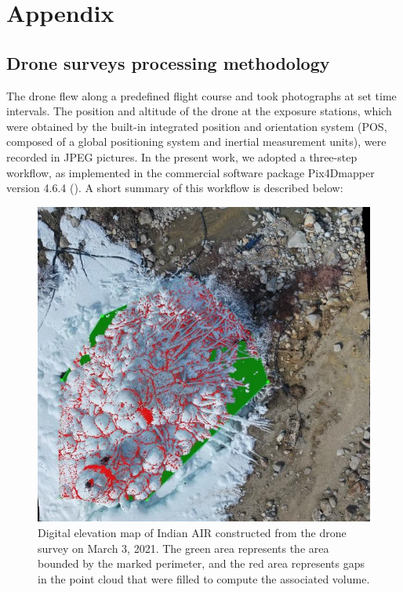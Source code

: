 \chapter{Appendix}
\label{sec:appendix}

\section{Drone surveys processing methodology}
\label{sec:drone_method}

The drone flew along a predefined flight course and took photographs at set time intervals. The
position and altitude of the drone at the exposure stations, which were obtained by the built-in integrated
position and orientation system (POS, composed of a global positioning system and inertial measurement units),
were recorded in JPEG pictures. In the present work, we adopted a three-step workflow, as implemented in the
commercial software package Pix4Dmapper version 4.6.4 (\cite{pix4dsaPix4DmapperUserManual2020}). A short summary of this workflow is
described below:

\begin{figure}
	\begin{center}
		\includegraphics[width=12 cm]{figs/pix4d.jpg}
	\end{center}
	\caption{Digital elevation map of Indian \ac{AIR} constructed from the drone survey on March 3, 2021. The green
		area represents the area bounded by the marked perimeter, and the red area represents gaps in the point cloud
    that were filled to compute the associated volume.
	}
	\label{fig:DEM}
\end{figure}


